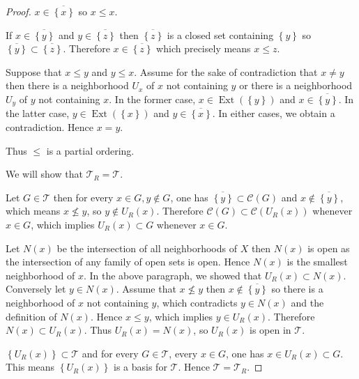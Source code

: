 \begin{proof}
    \( x \in \overline{\left\{ x \right\}} \) so \( x \le x \).

    If \( x \in \overline{\left\{ y \right\}} \) and \( y \in \overline{ \left\{z\right\} } \) then \( \overline{\left\{ z\right\} } \) is a closed set containing \( \left\{ y \right\} \) so \( \overline{ \left\{ y \right\} } \subset \overline{ \left\{ z \right\} } \). Therefore \( x \in \overline{ \left\{ z \right\} } \) which precisely means \( x \le z \).

    Suppose that \( x \le y \) and \( y \le x \). Assume for the sake of contradiction that \( x \ne y \) then there is a neighborhood \( U_{x} \) of \(x\) not containing \( y \) or there is a neighborhood \( U_{y} \) of \(y\) not containing \( x \). In the former case, \( x \in \operatorname{Ext}(\left\{y\right\}) \) and \( x \in \overline{ \left\{y\right\} } \). In the latter case, \( y \in \operatorname{Ext}(\left\{x\right\}) \) and \( y \in \overline{ \left\{x\right\} } \). In either cases, we obtain a contradiction. Hence \( x = y \).

    Thus \( \le \) is a partial ordering.

    \hrulefill%

    We will show that \( \mathscr{T}_{R} = \mathscr{T} \).

    Let \( G \in \mathscr{T} \) then for every \( x \in G, y \notin G \), one has \( \overline{ \left\{y\right\} } \subset \mathscr{C}(G) \) and \( x \notin \overline{ \left\{y\right\} } \), which means \( x \nleq y \), so \( y \notin U_{R}(x) \). Therefore \( \mathscr{C}(G) \subset \mathscr{C}(U_{R}(x)) \) whenever \( x \in G \), which implies \( U_{R}(x) \subset G \) whenever \( x \in G \).

    Let \( N(x) \) be the intersection of all neighborhoods of \(X\) then \( N(x) \) is open as the intersection of any family of open sets is open. Hence \( N(x) \) is the smallest neighborhood of \(x\). In the above paragraph, we showed that \( U_{R}(x) \subset N(x) \). Conversely let \( y \in N(x) \). Assume that \( x \nleq y \) then \( x \notin \overline{\left\{ y \right\}} \) so there is a neighborhood of \( x \) not containing \( y \), which contradicts \( y \in N(x) \) and the definition of \(N(x)\). Hence \( x \le y \), which implies \( y \in U_{R}(x) \). Therefore \( N(x) \subset U_{R}(x) \). Thus \( U_{R}(x) = N(x) \), so \( U_{R}(x) \) is open in \( \mathscr{T} \).

    \( \left\{ U_{R}(x) \right\} \subset \mathscr{T} \) and for every \( G \in \mathscr{T} \), every \( x \in G \), one has \( x \in U_{R}(x) \subset G \). This means \( \left\{ U_{R}(x) \right\} \) is a basis for \( \mathscr{T} \). Hence \( \mathscr{T} = \mathscr{T}_{R} \).
\end{proof}

